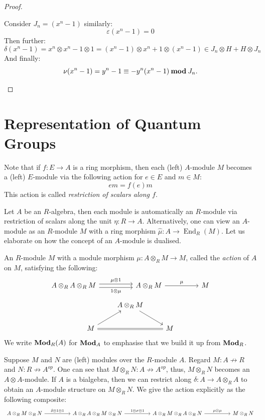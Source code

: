 \documentclass[8pt]{article}
\theoremstyle{definition}
\theoremstyle{definition}
\theoremstyle{definition}
\theoremstyle{definition}
\theoremstyle{definition}
\theoremstyle{definition}
\theoremstyle{definition}
\theoremstyle{definition}
\theoremstyle{definition}
\theoremstyle{definition}
\theoremstyle{definition}
\theoremstyle{definition}
\theoremstyle{definition}
\theoremstyle{definition}
\theoremstyle{question}
\begin{document}
\begin{proof}
\begin{enumerate}
    Consider $J_n = (x^n - 1)$ similarly:
    \[
    \varepsilon(x^n - 1) = 0
    \]
    Then further:
    \[
    \delta(x^n - 1) = x^n \otimes x^n - 1 \otimes 1 = (x^n - 1) \otimes x^n + 1 \otimes (x^n - 1) \in J_n \otimes H + H \otimes J_n
    \]
    And finally:
    \[
    \nu(x^n - 1) = y^n - 1 \equiv -y^n(x^n - 1) \: {\bf mod} \: J_n.
    \]
  \end{enumerate}
\end{proof}

\section{Representation of Quantum Groups}

Note that if $f : E \to A$ is a ring morphism, then each (left) $A$-module $M$ becomes a (left) $E$-module via the following action
for $e \in E$ and $m \in M$:
\[
e m = f(e) m
\]
This action is called \emph{restriction of scalars along $f$}.

Let $A$ be an $R$-algebra, then each module is automatically an $R$-module via restriction of scalars along the unit $\eta : R \to A$.
Alternatively, one can view an $A$-module as an $R$-module $M$ with a ring morphism $\hat{\mu} : A \to \operatorname{End}_R(M)$.
Let us elaborate on how the concept of an $A$-module is dualised.

An $R$-module $M$ with a module morphism $\mu : A \otimes_R M \to M$, called the \emph{action} of $A$ on $M$, satisfying the following:
\[
\begin{tikzcd}
  A \otimes_R A \otimes_R M \arrow[rr, shift left, "\mu \otimes 1"] \arrow[rr, shift right, "1 \otimes \mu"'] && A \otimes_R M \ar[rr, "\mu"] && M
\end{tikzcd}
\]
\[
\begin{tikzcd}
  & A \otimes_R M \ar[dr] \\
M \ar[rr, equal] \ar[ur] && M
\end{tikzcd}
\]
We write ${\bf Mod}_R(A)$ for ${\bf Mod}_A$ to emphasise that we build it up from ${\bf Mod}_R$.

Suppose $M$ and $N$ are (left) modules over the $R$-module $A$. Regard $M : A \not\to R$ and $N : R \not\to A^{op}$. One can see that
$M \otimes_R N : A \not\to A^{op}$, thus, $M \otimes_R N$ becomes an $A \otimes A$-module. If $A$ is a bialgebra, then we can restrict
along $\delta : A \to A \otimes_R A$ to obtain an $A$-module structure on $M \otimes_R N$. We give the action explicitly as the following composite:
\[
\begin{tikzcd}
  A \otimes_R M \otimes_R N \ar[rr, "\delta \otimes 1 \otimes 1"] && A \otimes_R A \otimes_R M \otimes_R N \ar[rr, "1 \otimes \sigma \otimes 1"] && A \otimes_R M \otimes_R A \otimes_R N \ar[rr, "\mu \otimes \mu"] && M \otimes_R N
\end{tikzcd}
\]
\end{document}

